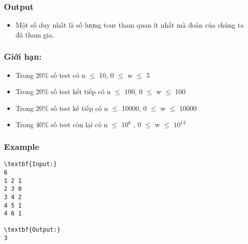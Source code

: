 \subsubsection{Output}
\begin{itemize}
	\item Một số duy nhất là số lượng tour tham quan ít nhất mà đoàn của chúng ta đã tham gia.
\end{itemize}

\subsubsection{Giới hạn:}
\begin{itemize}
	\item Trong 20\% số test có n  $\le$  10, 0  $\le$  w  $\le$  5
	\item Trong 20\% số test kết tiếp có n  $\le$  100, 0  $\le$  w  $\le$  100
	\item Trong 20\% số test kế tiếp có n  $\le$  10000, 0  $\le$  w  $\le$  10000
	\item Trong 40\% số test còn lại có n  $\le$  $10^{6}$ , 0  $\le$  w  $\le$  $10^{12}$
\end{itemize}

\subsubsection{Example}
\begin{verbatim}
\textbf{Input:}
6
1 2 1
2 3 0
3 4 2
4 5 1
4 6 1

\textbf{Output:}
3\end{verbatim}
